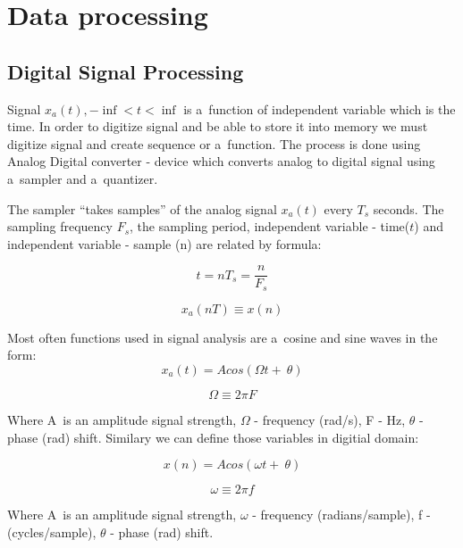 \documentclass[a4paper]{report}
\theoremstyle{definition}
\begin{document}
\chapter{Data processing}
\section{Digital Signal Processing}

Signal $x_a(t), -\inf < t < \inf$ is a~function of independent variable which is the time. In order to digitize signal and be able to store it into memory we must digitize signal and create sequence or a~function. The process is done using Analog Digital converter - device which converts analog to digital signal using a~sampler and a~quantizer.

The sampler ``takes samples'' of the analog signal $x_a(t)$ every $T_s$ seconds. The sampling frequency $F_s$, the sampling period, independent variable - time($t$) and independent variable - sample (n) are related by formula:

\begin{equation}
	t = nT_s = \frac{n}{F_s}
\end{equation}

\begin{equation}
	x_a(nT) \equiv x(n)
\end{equation}


Most often functions used in signal analysis are a~cosine and sine waves in the form:
\begin{equation}
	x_a(t) = Acos(\Omega t +~\theta)
\end{equation}

\begin{equation}
	\Omega \equiv 2\pi F
\end{equation}

Where A~is an amplitude signal strength, $\Omega$ - frequency (rad/s), F - Hz, $\theta$ - phase (rad) shift.  
Similary we can define those variables in digitial domain:

\begin{equation}
	x(n) = Acos(\omega t +~\theta)
\end{equation}

\begin{equation}
	\omega \equiv 2\pi f
\end{equation}


Where A~is an amplitude signal strength, $\omega$ - frequency (radians/sample), f - (cycles/sample), $\theta$ - phase (rad) shift.  
\end{document}
